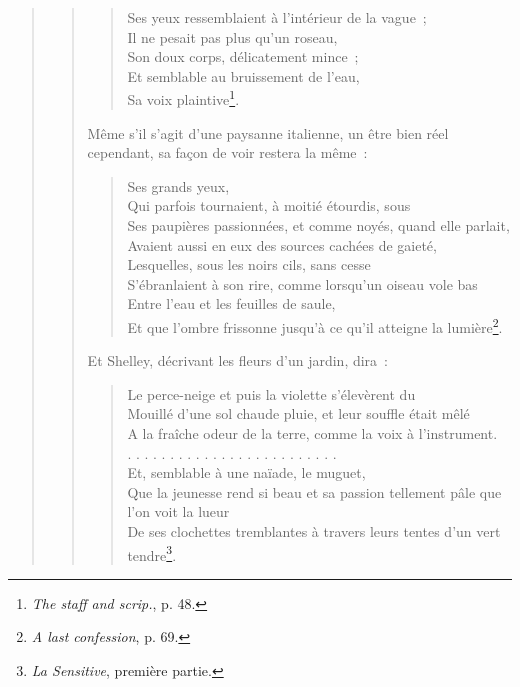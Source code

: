 \documentclass[french,twoside]{book} %
\begin{document}
\begin{verse}
\begin{verse}
\begin{verse}
Ses yeux ressemblaient à l’intérieur de la vague ;\\
Il ne pesait pas plus qu’un roseau,\\
Son doux corps, délicatement mince ;\\
Et semblable au bruissement de l’eau,\\
Sa voix plaintive\footnote{\emph{The staff and scrip.}, p. 48.}.\\
\end{verse}

\noindent Même s’il s’agit d’une paysanne italienne, un être bien réel cependant, sa façon de voir restera la même :\par


\begin{verse}
Ses grands yeux,\\
Qui parfois tournaient, à moitié étourdis, sous\\
Ses paupières passionnées, et comme noyés, quand elle parlait,\\
Avaient aussi en eux des sources cachées de gaieté,\\
Lesquelles, sous les noirs cils, sans cesse\\
S’ébranlaient à son rire, comme lorsqu’un oiseau vole bas\\
Entre l’eau et les feuilles de saule,\\
Et que l’ombre frissonne jusqu’à ce qu’il atteigne la lumière\footnote{\emph{A last confession}, p. 69.}.\\
\end{verse}

\noindent Et Shelley, décrivant les fleurs d’un jardin, dira :\par


\begin{verse}
Le perce-neige et puis la violette s’élevèrent du\\
Mouillé d’une sol chaude pluie, et leur souffle était mêlé\\
A la fraîche odeur de la terre, comme la voix à l’instrument.\\
. . . . . . . . . . . . . . . . . . . . . . . . .\\
Et, semblable à une naïade, le muguet,\\
Que la jeunesse rend si beau et sa passion tellement pâle que l’on voit la lueur\\
De ses clochettes tremblantes à travers leurs tentes d’un vert tendre\footnote{\emph{La Sensitive}, première partie.}.\\
\end{verse}


\end{verse}
\end{verse}
\end{document}
